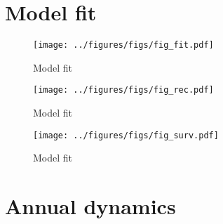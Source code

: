 

\section*{Model fit} \label{fit}


\clearpage

\begin{figure}
\centering
\texttt{[image: ../figures/figs/fig\_fit.pdf]}
\caption{\label{fig:fit}
Model fit
}
\end{figure}

\clearpage

\clearpage

\begin{figure}
\centering
\texttt{[image: ../figures/figs/fig\_rec.pdf]}
\caption{\label{fig:fit}
Model fit
}
\end{figure}

\clearpage

\clearpage

\begin{figure}
\centering
\texttt{[image: ../figures/figs/fig\_surv.pdf]}
\caption{\label{fig:fit}
Model fit
}
\end{figure}

\clearpage


\section*{Annual dynamics} \label{annual}

